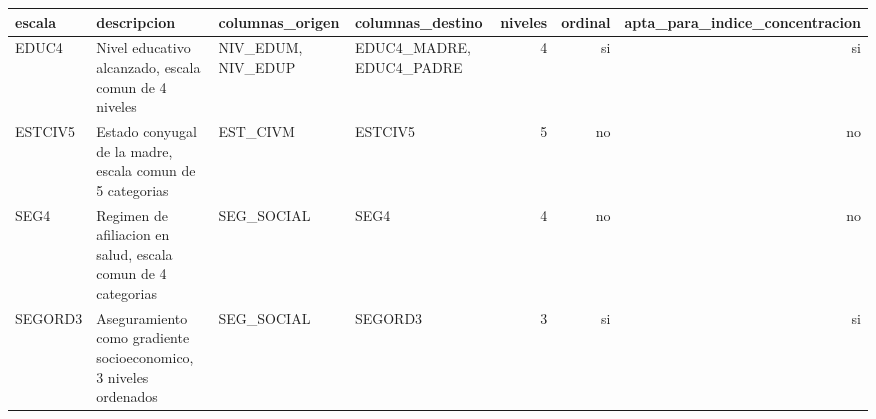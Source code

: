 \begin{tabular}{llllrrr}
\toprule
escala & descripcion & columnas\_origen & columnas\_destino & niveles & ordinal & apta\_para\_indice\_concentracion \\
\midrule
EDUC4 & Nivel educativo alcanzado, escala comun de 4 niveles & NIV\_EDUM, NIV\_EDUP & EDUC4\_MADRE, EDUC4\_PADRE & 4 & si & si \\
ESTCIV5 & Estado conyugal de la madre, escala comun de 5 categorias & EST\_CIVM & ESTCIV5 & 5 & no & no \\
SEG4 & Regimen de afiliacion en salud, escala comun de 4 categorias & SEG\_SOCIAL & SEG4 & 4 & no & no \\
SEGORD3 & Aseguramiento como gradiente socioeconomico, 3 niveles ordenados & SEG\_SOCIAL & SEGORD3 & 3 & si & si \\
\bottomrule
\end{tabular}
